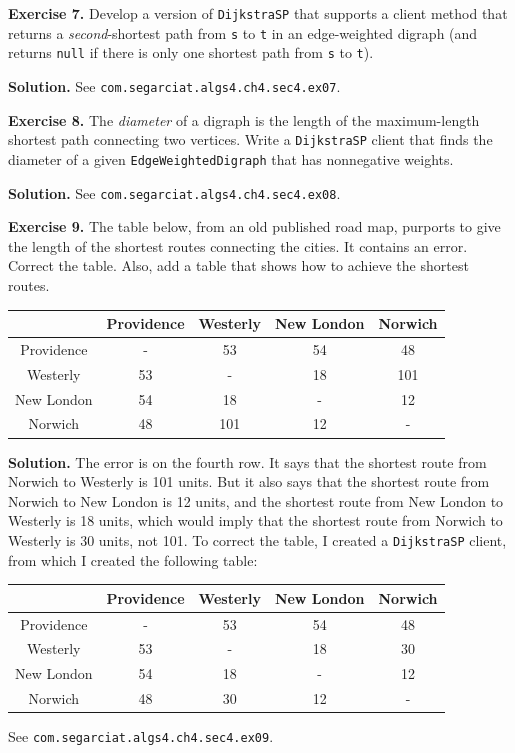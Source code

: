 \documentclass[12pt, a4paper]{article}
\newenvironment{ex}[2][Exercise]
{\par\medskip\noindent \textbf{#1 #2.}}
{\medskip}
\newenvironment{sol}[1][Solution]
{\par\medskip\noindent \textbf{#1.} }
{\medskip}
\begin{document}
	\begin{ex}{7}
		Develop a version of \texttt{DijkstraSP} that supports a client method that returns
		a \emph{second}-shortest path from \texttt{s} to \texttt{t} in an edge-weighted digraph
		(and returns \texttt{null} if there is only one shortest path from \texttt{s} to \texttt{t}).
	\end{ex}
	\begin{sol}
		See \texttt{com.segarciat.algs4.ch4.sec4.ex07}.
	\end{sol}
	\begin{ex}{8}
		The \emph{diameter} of a digraph is the length of the maximum-length shortest
		path connecting two vertices. Write a \texttt{DijkstraSP} client that finds the
		diameter of a given \texttt{EdgeWeightedDigraph} that has nonnegative weights.
	\end{ex}
	\begin{sol}
		See \texttt{com.segarciat.algs4.ch4.sec4.ex08}.
	\end{sol}
	\begin{ex}{9}
		The table below, from an old published road map, purports to give the length
		of the shortest routes connecting the cities. It contains an error. Correct
		the table. Also, add a table that shows how to achieve the shortest routes.
		\begin{center}
			\begin{tabular}{c|cccc}
				{} & Providence & Westerly & New London & Norwich\\
				\hline
				Providence & - & 53 & 54 & 48\\
				\hline
				Westerly & 53 & - & 18 & 101\\
				\hline
				New London & 54 & 18 & - & 12\\
				\hline
				Norwich & 48 & 101 & 12 & -
			\end{tabular}
		\end{center}
	\end{ex}
	\begin{sol}
		The error is on the fourth row. It says that the shortest route from Norwich
		to Westerly is 101 units. But it also says that the shortest route from
		Norwich to New London is 12 units, and the shortest route from New London
		to Westerly is 18 units, which would imply that the shortest route from
		Norwich to Westerly is 30 units, not 101. To correct the table, I created
		a \texttt{DijkstraSP} client, from which I created the following table:
		\begin{center}
			\begin{tabular}{c|cccc}
				{} & Providence & Westerly & New London & Norwich\\
				\hline
				Providence & - & 53 & 54 & 48\\
				\hline
				Westerly & 53 & - & 18 & 30\\
				\hline
				New London & 54 & 18 & - & 12\\
				\hline
				Norwich & 48 & 30 & 12 & -
			\end{tabular}
		\end{center}
		See \texttt{com.segarciat.algs4.ch4.sec4.ex09}.
	\end{sol}
\end{document}
